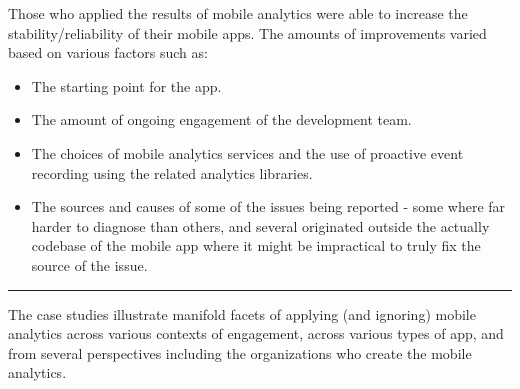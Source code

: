 Those who applied the results of mobile analytics were able to increase the stability/reliability of their mobile apps. The amounts of improvements varied based on various factors such as:
\begin{itemize}
    \itemsep0em
    \item The starting point for the app.
    \item The amount of ongoing engagement of the development team.
    \item The choices of mobile analytics services and the use of proactive event recording using the related analytics libraries.
    \item The sources and causes of some of the issues being reported - some where far harder to diagnose than others, and several originated outside the actually codebase of the mobile app where it might be impractical to truly fix the source of the issue.
\end{itemize}

\noindent
\rule{\textwidth}{0.4pt}

The case studies illustrate manifold facets of applying (and ignoring) mobile analytics across various contexts of engagement, across various types of app, and from several perspectives including the organizations who create the mobile analytics.